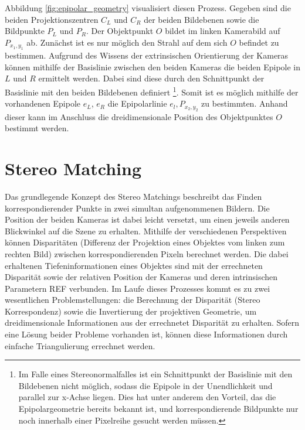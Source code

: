 \noindent
Abbildung \ref{fig:epipolar_geometry} visualisiert diesen Prozess. Gegeben sind die beiden Projektionszentren $C_L$ und $C_R$ der beiden Bildebenen sowie die Bildpunkte $P_L$ und $P_R$. Der Objektpunkt $O$ bildet im linken Kamerabild auf $P_{x_1,y_1}$ ab. Zunächst ist es nur möglich den Strahl auf dem sich $O$ befindet zu bestimmen. Aufgrund des Wissens der extrinsischen Orientierung der Kameras können mithilfe der Basislinie zwischen den beiden Kameras die beiden Epipole in $L$ und $R$ ermittelt werden. Dabei sind diese durch den Schnittpunkt der Basislinie mit den beiden Bildebenen definiert \footnote{Im Falle eines Stereonormalfalles ist ein Schnittpunkt der Basislinie mit den Bildebenen nicht möglich, sodass die Epipole in der Unendlichkeit und parallel zur x-Achse liegen. Dies hat unter anderem den Vorteil, das die Epipolargeometrie bereits bekannt ist, und korrespondierende Bildpunkte nur noch innerhalb einer Pixelreihe gesucht werden müssen.}. Somit ist es möglich mithilfe der vorhandenen Epipole $e_L$, $e_R$ die Epipolarlinie $e_l,P_{x_2,y_2}$ zu bestimmten. Anhand dieser kann im Anschluss die dreidimensionale Position des Objektpunktes $O$ bestimmt werden.

\section{Stereo Matching}
\label{sec:stereo_matching}
Das grundlegende Konzept des Stereo Matchings beschreibt das Finden korrespondierender Punkte in zwei simultan aufgenommenen Bildern. Die Position der beiden Kameras ist dabei leicht versetzt, um einen jeweils anderen Blickwinkel auf die Szene zu erhalten. Mithilfe der verschiedenen Perspektiven können Disparitäten (Differenz der Projektion eines Objektes vom linken zum rechten Bild) zwischen korrespondierenden Pixeln berechnet werden. Die dabei erhaltenen Tiefeninformationen eines Objektes sind mit der errechneten Disparität sowie der relativen Position der Kameras und deren intrinsischen Parametern REF verbunden.
Im Laufe dieses Prozesses kommt es zu zwei wesentlichen Problemstellungen: die Berechnung der Disparität (Stereo Korrespondenz) sowie die Invertierung der projektiven Geometrie, um dreidimensionale Informationen aus der errechnetet Disparität zu erhalten. Sofern eine Lösung beider Probleme vorhanden ist, können diese Informationen durch einfache Triangulierung errechnet werden.


